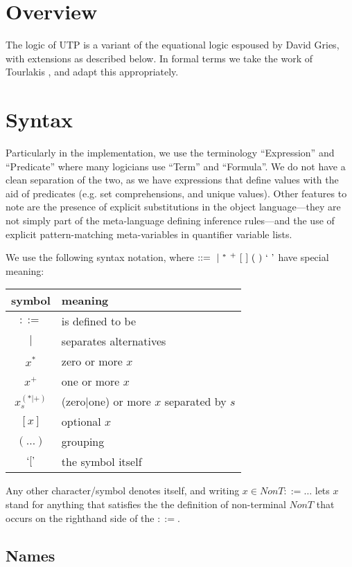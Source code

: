 \section{Overview}

The logic of UTP is a variant of the equational logic
espoused by David Gries\cite{gries.93}, with extensions as described below.
In formal terms we take the work of Tourlakis \cite{journals/logcom/Tourlakis01},
and adapt this appropriately.

\section{Syntax}

Particularly in the implementation, we use the terminology
``Expression'' and ``Predicate''
where many logicians use ``Term'' and ``Formula''.
We do not have a clean separation of the two,
as we have expressions that define values with the aid of predicates
(e.g. set comprehensions, and unique values).
Other features to note are the presence of explicit substitutions
in the object language---they are not simply part of the meta-language
defining inference rules---and the use of explicit pattern-matching
meta-variables in quantifier variable lists.

We use the following syntax notation, where
$::=~|~{}^*~{}^+~[~]~(~)~\mbox{`$\mathtt{~}$'}$ have special meaning:

\begin{tabular}{|c|l|}
  \hline
  symbol & meaning
\\\hline
  $::=$ & is defined to be
\\
  $|$ & separates alternatives
\\
  $x^*$ & zero or more $x$
\\
  $x^+$ & one or more $x$
\\
  $x^{(*|+)}_s$ & (zero$|$one) or more $x$ separated by $s$
\\
  $[x]$ & optional $x$
\\
  $(\ldots)$ & grouping
\\
  $\mbox{`$\mathtt{[}$'}$ & the symbol itself
\\\hline
\end{tabular}

Any other character/symbol denotes itself,
and writing $x \in NonT ::= \ldots$ lets $x$ stand for anything that
satisfies the the definition of non-terminal $NonT$
that occurs on the righthand side of the $::=$.

\subsection{Names}


